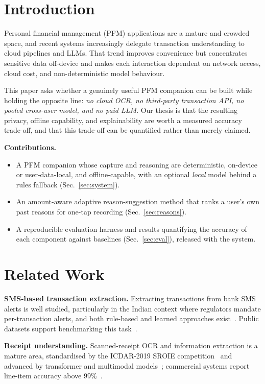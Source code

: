 \documentclass[conference]{IEEEtran}
\begin{document}
\section{Introduction}
Personal financial management (PFM) applications are a mature and crowded space,
and recent systems increasingly delegate transaction understanding to cloud
pipelines and LLMs. That trend improves convenience but concentrates sensitive
data off-device and makes each interaction dependent on network access, cloud
cost, and non-deterministic model behaviour.

This paper asks whether a genuinely useful PFM companion can be built while
holding the opposite line: \emph{no cloud OCR, no third-party transaction API,
no pooled cross-user model, and no paid LLM}. Our thesis is that the resulting
privacy, offline capability, and explainability are worth a measured accuracy
trade-off, and that this trade-off can be quantified rather than merely claimed.

\textbf{Contributions.}
\begin{itemize}
\item A PFM companion whose capture and reasoning are deterministic, on-device
      or user-data-local, and offline-capable, with an optional \emph{local}
      model behind a rules fallback (Sec.~\ref{sec:system}).
\item An amount-aware adaptive reason-suggestion method that ranks a user's own
      past reasons for one-tap recording (Sec.~\ref{sec:reasons}).
\item A reproducible evaluation harness and results quantifying the accuracy of
      each component against baselines (Sec.~\ref{sec:eval}), released with the
      system.
\end{itemize}

\section{Related Work}
\label{sec:related}
\textbf{SMS-based transaction extraction.} Extracting transactions from bank SMS
alerts is well studied, particularly in the Indian context where regulators
mandate per-transaction alerts, and both rule-based and learned approaches
exist~\cite{smssmsref, nlpframework}. Public datasets support benchmarking
this task~\cite{kagglesms}.

\textbf{Receipt understanding.} Scanned-receipt OCR and information extraction is
a mature area, standardised by the ICDAR-2019 SROIE
competition~\cite{sroie} and advanced by transformer and multimodal
models~\cite{receiptmm}; commercial systems report line-item accuracy above
99\%~\cite{veryfi}.
\end{document}
